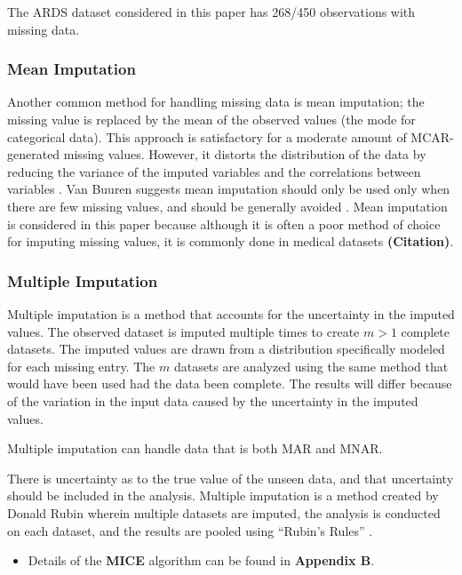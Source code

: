 \documentclass[12pt,]{article}
\providecommand{\tightlist}{%
  \setlength{\itemsep}{0pt}\setlength{\parskip}{0pt}}
\begin{document}
The ARDS dataset considered in this paper has 268/450 observations with
missing data.

\subsubsection{Mean Imputation}\label{mean-imputation}

Another common method for handling missing data is mean imputation; the
missing value is replaced by the mean of the observed values (the mode
for categorical data). This approach is satisfactory for a moderate
amount of MCAR-generated missing values. However, it distorts the
distribution of the data by reducing the variance of the imputed
variables and the correlations between variables
\citep{little_bayes_2014}. Van Buuren suggests mean imputation should
only be used only when there are few missing values, and should be
generally avoided \citep{van_buuren_flexible_2012}. Mean imputation is
considered in this paper because although it is often a poor method of
choice for imputing missing values, it is commonly done in medical
datasets \textbf{(Citation)}.

\subsubsection{Multiple Imputation}\label{multiple-imputation}

Multiple imputation is a method that accounts for the uncertainty in the
imputed values. The observed dataset is imputed multiple times to create
\(m>1\) complete datasets. The imputed values are drawn from a
distribution specifically modeled for each missing entry. The \(m\)
datasets are analyzed using the same method that would have been used
had the data been complete. The results will differ because of the
variation in the input data caused by the uncertainty in the imputed
values.

Multiple imputation can handle data that is both MAR and MNAR.

There is uncertainty as to the true value of the unseen data, and that
uncertainty should be included in the analysis. Multiple imputation is a
method created by Donald Rubin wherein multiple datasets are imputed,
the analysis is conducted on each dataset, and the results are pooled
using ``Rubin's Rules'' \citep{rubin_inference_1976}.

\begin{itemize}
\tightlist
\item
  Details of the \textbf{MICE} algorithm can be found in
  \textbf{Appendix B}.
\end{itemize}
\end{document}
